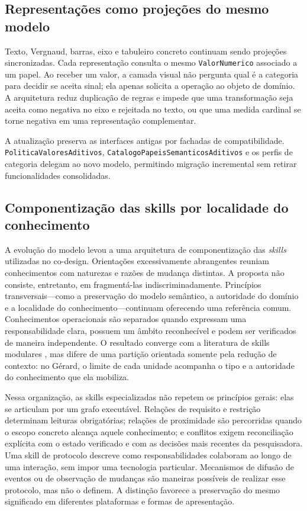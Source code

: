 \documentclass[preprint,12pt,authoryear]{elsarticle}
\newcommand{\gerard}{Gérard\xspace}
\begin{document}
\subsection{Representações como projeções do mesmo modelo}

Texto, Vergnaud, barras, eixo e tabuleiro concreto continuam sendo projeções sincronizadas. Cada representação consulta o mesmo \texttt{ValorNumerico} associado a um papel. Ao receber um valor, a camada visual não pergunta qual é a categoria para decidir se aceita sinal; ela apenas solicita a operação ao objeto de domínio. A arquitetura reduz duplicação de regras e impede que uma transformação seja aceita como negativa no eixo e rejeitada no texto, ou que uma medida cardinal se torne negativa em uma representação complementar.

A atualização preserva as interfaces antigas por fachadas de compatibilidade. \texttt{PoliticaValoresAditivos}, \texttt{CatalogoPapeisSemanticosAditivos} e os perfis de categoria delegam ao novo modelo, permitindo migração incremental sem retirar funcionalidades consolidadas.

\subsection{Componentização das skills por localidade do conhecimento}

A evolução do modelo levou a uma arquitetura de componentização das \emph{skills} utilizadas no co-design. Orientações excessivamente abrangentes reuniam conhecimentos com naturezas e razões de mudança distintas. A proposta não consiste, entretanto, em fragmentá-las indiscriminadamente. Princípios transversais---como a preservação do modelo semântico, a autoridade do domínio e a localidade do conhecimento---continuam oferecendo uma referência comum. Conhecimentos operacionais são separados quando expressam uma responsabilidade clara, possuem um âmbito reconhecível e podem ser verificados de maneira independente. O resultado converge com a literatura de skills modulares \citep{badhe2026survey,zare2026microskill}, mas difere de uma partição orientada somente pela redução de contexto: no \gerard, o limite de cada unidade acompanha o tipo e a autoridade do conhecimento que ela mobiliza.

Nessa organização, as skills especializadas não repetem os princípios gerais: elas se articulam por um grafo executável. Relações de requisito e restrição determinam leituras obrigatórias; relações de proximidade são percorridas quando o escopo concreto alcança aquele conhecimento; e conflitos exigem reconciliação explícita com o estado verificado e com as decisões mais recentes da pesquisadora. Uma skill de protocolo descreve como responsabilidades colaboram ao longo de uma interação, sem impor uma tecnologia particular. Mecanismos de difusão de eventos ou de observação de mudanças são maneiras possíveis de realizar esse protocolo, mas não o definem. A distinção favorece a preservação do mesmo significado em diferentes plataformas e formas de apresentação.
\end{document}
